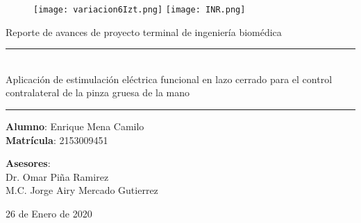 \begin{titlepage}
\begin{center}

\begin{figure}
	\centering
	\texttt{[image: variacion6Izt.png]}
	\hfill
	\texttt{[image: INR.png]}
\end{figure}

\hfill \break

\LARGE{Reporte de avances de proyecto terminal de ingeniería biomédica}

\vspace{1cm}

\rule{18cm}{0.5mm}\\
\LARGE{Aplicación de estimulación eléctrica funcional en lazo cerrado para el control contralateral de la pinza gruesa de la mano\\}
\rule{18cm}{0.5mm}

\vspace{1cm}

\Large{	\textbf{Alumno}: Enrique Mena Camilo\\
		\textbf{Matrícula}: 2153009451\\}

\vspace{1cm}

\Large{\textbf{Asesores}:\\Dr. Omar Piña Ramirez\\M.C. Jorge Airy Mercado Gutierrez}

\vspace{1cm}

\Large{26 de Enero de 2020}

\end{center}
\end{titlepage}
